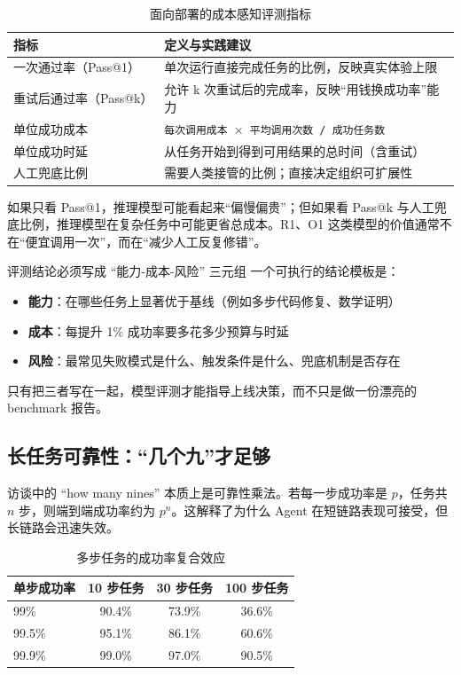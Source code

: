 \begin{table}[H]
\centering
\begin{tabular}{lp{9cm}}
\toprule
\textbf{指标} & \textbf{定义与实践建议} \\
\midrule
一次通过率（Pass@1） & 单次运行直接完成任务的比例，反映真实体验上限 \\
重试后通过率（Pass@k） & 允许 k 次重试后的完成率，反映``用钱换成功率''能力 \\
单位成功成本 & \texttt{每次调用成本 $\times$ 平均调用次数 / 成功任务数} \\
单位成功时延 & 从任务开始到得到可用结果的总时间（含重试） \\
人工兜底比例 & 需要人类接管的比例；直接决定组织可扩展性 \\
\bottomrule
\end{tabular}
\caption{面向部署的成本感知评测指标}
\end{table}

如果只看 Pass@1，推理模型可能看起来``偏慢偏贵''；但如果看 Pass@k 与人工兜底比例，推理模型在复杂任务中可能更省总成本。R1、O1 这类模型的价值通常不在``便宜调用一次''，而在``减少人工反复修错''。

\begin{importantbox}{评测结论必须写成 ``能力-成本-风险'' 三元组}
一个可执行的结论模板是：
\begin{itemize}
    \item \textbf{能力}：在哪些任务上显著优于基线（例如多步代码修复、数学证明）
    \item \textbf{成本}：每提升 1\% 成功率要多花多少预算与时延
    \item \textbf{风险}：最常见失败模式是什么、触发条件是什么、兜底机制是否存在
\end{itemize}

只有把三者写在一起，模型评测才能指导上线决策，而不只是做一份漂亮的 benchmark 报告。
\end{importantbox}

\subsection{长任务可靠性：``几个九''才足够}

访谈中的 ``how many nines'' 本质上是可靠性乘法。若每一步成功率是 $p$，任务共 $n$ 步，则端到端成功率约为 $p^n$。这解释了为什么 Agent 在短链路表现可接受，但长链路会迅速失效。

\begin{table}[H]
\centering
\begin{tabular}{lccc}
\toprule
\textbf{单步成功率} & \textbf{10 步任务} & \textbf{30 步任务} & \textbf{100 步任务} \\
\midrule
99\% & 90.4\% & 73.9\% & 36.6\% \\
99.5\% & 95.1\% & 86.1\% & 60.6\% \\
99.9\% & 99.0\% & 97.0\% & 90.5\% \\
\bottomrule
\end{tabular}
\caption{多步任务的成功率复合效应}
\end{table}

